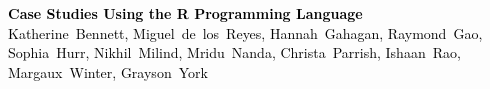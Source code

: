 \documentclass[11pt]{book} %
\begin{document}

\begingroup
\thispagestyle{empty}
\centering
\vspace*{7.5cm}
\par\normalfont\Huge\sffamily\selectfont
\textbf{\textcolor{black}{Case Studies Using the R Programming Language}}\\
{\normalsize \textcolor{black}{ Katherine~Bennett, Miguel~de~los~Reyes, Hannah~Gahagan, Raymond~Gao, Sophia~Hurr, Nikhil~Milind, Mridu~Nanda, Christa~Parrish, Ishaan~Rao, Margaux~Winter, Grayson~York}}\par %
\endgroup

\end{document}
